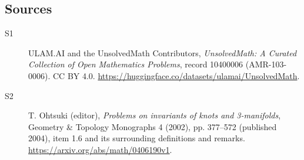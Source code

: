 \documentclass[11pt]{article}
\begin{document}
\subsection{Sources}
\begin{description}
\item[\hypertarget{source:10400006:1}{S1}] ULAM.AI and the UnsolvedMath Contributors, \emph{UnsolvedMath: A Curated Collection of Open Mathematics Problems}, record 10400006 (AMR-103-0006). CC BY 4.0. \url{https://huggingface.co/datasets/ulamai/UnsolvedMath}.
\item[\hypertarget{source:10400006:2}{S2}] T. Ohtsuki (editor), \emph{Problems on invariants of knots and 3-manifolds}, Geometry \& Topology Monographs 4 (2002), pp. 377--572 (published 2004), item 1.6 and its surrounding definitions and remarks. \url{https://arxiv.org/abs/math/0406190v1}.
\end{description}
\label{end:10400006}
\end{document}
